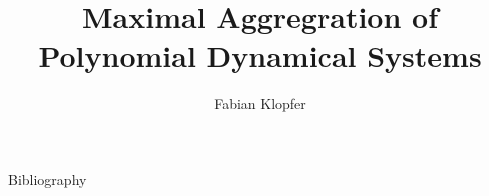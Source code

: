 \documentclass[rgb]{beamer}
\title{Maximal Aggregration of Polynomial Dynamical Systems}
\author{Fabian Klopfer}
\date{\thedate}
\institute{Modelling of Complex Self-Organizing Systems Group}
\begin{document}
    \begin{frame}
        \titlepage
    \end{frame}

    
    \begin{frame}{Bibliography}
        \printbibliography
    \end{frame}
\end{document}
